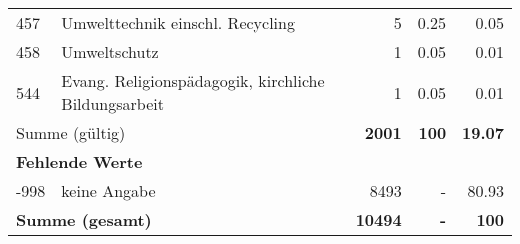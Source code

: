 \begin{longtable}{lXrrr}
        457 & \multicolumn{1}{X}{Umwelttechnik einschl. Recycling} & %
          \num{5} &
          \num[round-mode=places,round-precision=2]{0,25} &
          \num[round-mode=places,round-precision=2]{0,05} \\

        458 & \multicolumn{1}{X}{Umweltschutz} & %
          \num{1} &
          \num[round-mode=places,round-precision=2]{0,05} &
          \num[round-mode=places,round-precision=2]{0,01} \\

        544 & \multicolumn{1}{X}{Evang. Religionspädagogik, kirchliche Bildungsarbeit} & %
          \num{1} &
          \num[round-mode=places,round-precision=2]{0,05} &
          \num[round-mode=places,round-precision=2]{0,01} \\

     \midrule
     \multicolumn{2}{l}{Summe (gültig)} &
       \textbf{\num{2001}} &
     \textbf{100} &
       \textbf{\num[round-mode=places,round-precision=2]{19,07}} \\
     \multicolumn{5}{l}{\textbf{Fehlende Werte}}\\
       -998 &
       keine Angabe &
         \num{8493} &
        - &
         \num[round-mode=places,round-precision=2]{80,93} \\
     \midrule
     \multicolumn{2}{l}{\textbf{Summe (gesamt)}} &
          \textbf{\num{10494}} &
        \textbf{-} &
        \textbf{100} \\
     \bottomrule
     \end{longtable}
     
